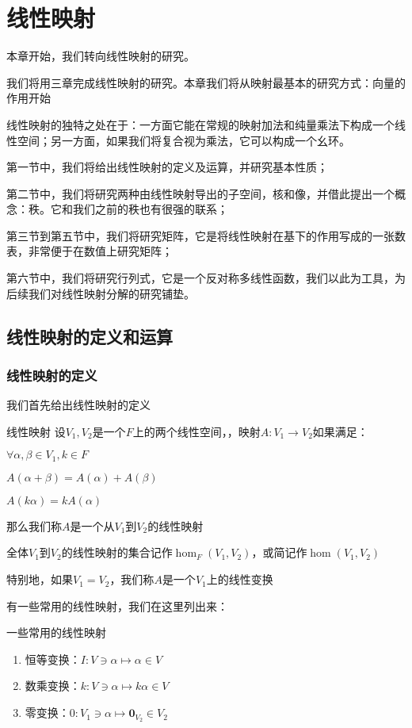 \documentclass[12pt, a4paper, oneside, UTF8]{ctexbook}
\begin{document}
% 
\else
\fi
\chapter{线性映射}
	本章开始，我们转向线性映射的研究。

	我们将用三章完成线性映射的研究。本章我们将从映射最基本的研究方式：向量的作用开始

	线性映射的独特之处在于：一方面它能在常规的映射加法和纯量乘法下构成一个线性空间；另一方面，如果我们将复合视为乘法，它可以构成一个幺环。

	第一节中，我们将给出线性映射的定义及运算，并研究基本性质；
	
	第二节中，我们将研究两种由线性映射导出的子空间，核和像，并借此提出一个概念：秩。它和我们之前的秩也有很强的联系；

	第三节到第五节中，我们将研究矩阵，它是将线性映射在基下的作用写成的一张数表，非常便于在数值上研究矩阵；

	第六节中，我们将研究行列式，它是一个反对称多线性函数，我们以此为工具，为后续我们对线性映射分解的研究铺垫。
	\section{线性映射的定义和运算}
		\subsection{线性映射的定义}
			我们首先给出线性映射的定义
			\begin{defn}{线性映射}{}
				设$V_1,V_2$是一个$F$上的两个线性空间，，映射$A:V_1 \to V_2$如果满足：

				$\forall \alpha ,\beta \in V_1,k \in F$

				$A(\alpha+\beta )=A(\alpha )+A(\beta )$

				$A(k\alpha )=kA(\alpha )$

				那么我们称$A$是一个从$V_1$到$V_2$的线性映射

				全体$V_1$到$V_2$的线性映射的集合记作$\hom_F (V_1,V_2)$，或简记作$\hom (V_1,V_2)$

				特别地，如果$V_1=V_2$，我们称$A$是一个$V_1$上的线性变换
			\end{defn}
			有一些常用的线性映射，我们在这里列出来：
			\begin{defn}{一些常用的线性映射}{}
				\begin{enumerate}
					\item 恒等变换：$I:V \ni \alpha \mapsto \alpha \in V$
					\item 数乘变换：$k:V \ni \alpha \mapsto k\alpha \in V$
					\item 零变换：$0:V_1 \ni \alpha \mapsto \mathbf{0}_{V_2} \in V_2$
				\end{enumerate}
			\end{defn}
\end{document}
